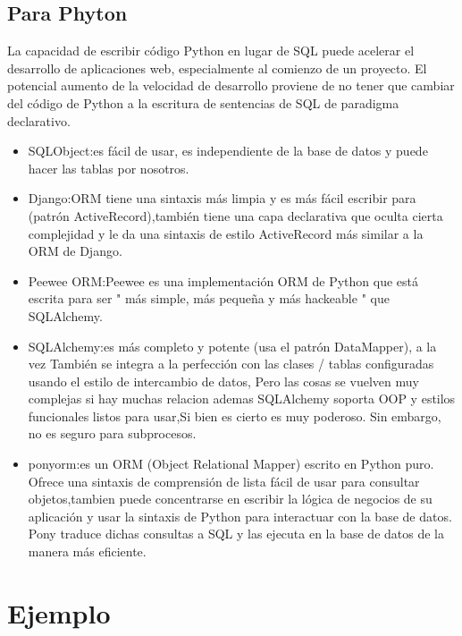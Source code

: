 \documentclass[%
 reprint,
 amsmath,amssymb,
 aps,
]{revtex4-1}
\begin{document}
\subsection{Para Phyton}
La capacidad de escribir código Python en lugar de SQL puede acelerar el desarrollo de aplicaciones web, especialmente al comienzo de un proyecto. El potencial aumento de la velocidad de desarrollo proviene de no tener que cambiar del código de Python a la escritura de sentencias de SQL de paradigma declarativo.\cite{Phyton}
\begin{itemize}
	\item SQLObject:es fácil de usar, es independiente de la base de datos y puede hacer las tablas por nosotros. 
	\item  Django:ORM tiene una sintaxis más limpia y es más fácil escribir para (patrón ActiveRecord),también tiene una capa declarativa que oculta cierta complejidad y le da una sintaxis de estilo ActiveRecord más similar a la ORM de Django.
	\item  Peewee ORM:Peewee es una implementación ORM de Python que está escrita para ser " más simple, más pequeña y más hackeable " que SQLAlchemy. 
           \item SQLAlchemy:es más completo y potente (usa el patrón DataMapper), a la vez También se integra a la perfección con las clases / tablas configuradas usando el estilo de intercambio de datos, Pero las cosas se vuelven muy complejas si hay muchas relacion ademas SQLAlchemy soporta OOP y estilos funcionales listos para usar,Si bien es cierto es muy poderoso. Sin embargo, no es seguro para subprocesos.
          \item ponyorm:es un ORM (Object Relational Mapper) escrito en Python puro. Ofrece una sintaxis de comprensión de lista fácil de usar para consultar objetos,tambien puede concentrarse en escribir la lógica de negocios de su aplicación y usar la sintaxis de Python para interactuar con la base de datos. Pony traduce dichas consultas a SQL y las ejecuta en la base de datos de la manera más eficiente.\cite{poni}

\end{itemize}


\section{Ejemplo}\label{sec:4}
\end{document}
